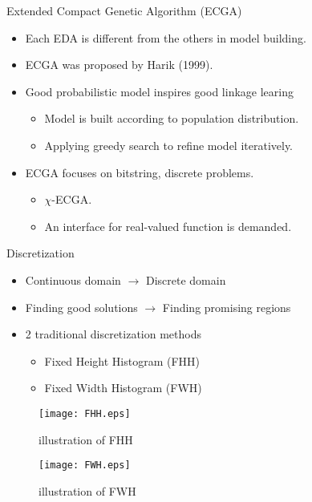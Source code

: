 \begin{frame}{Extended Compact Genetic Algorithm (ECGA)}
  \begin{itemize}
    \item Each EDA is different from the others in \alert{model
      building}.
      \vspace*{14pt}
    \item ECGA was proposed by Harik (1999).
      \vspace*{14pt}
    \item Good probabilistic model inspires good linkage learing
      \begin{itemize}
        \item Model is built according to population distribution.
        \item Applying greedy search to refine model iteratively.
      \end{itemize}
      \vspace*{14pt}
    \item ECGA focuses on bitstring, discrete problems.
      \begin{itemize}
        \item $\chi$-ECGA.
        \item An interface for real-valued function is demanded.
      \end{itemize}
  \end{itemize}
\end{frame}

\begin{frame}{Discretization} 
  \begin{itemize} 
    \item Continuous domain $\rightarrow$ Discrete domain 
    \item Finding good solutions $\rightarrow$ Finding promising
      regions
    \item 2 traditional discretization methods
      \begin{itemize}
        \item Fixed Height Histogram (FHH)
        \item Fixed Width Histogram (FWH)
      \end{itemize}
  \end{itemize}
  \begin{minipage}{.45\textwidth}
    \begin{figure}
      \centering
      \texttt{[image: FHH.eps]}
      \caption{illustration of FHH}
    \end{figure}
  \end{minipage}
  \begin{minipage}{.45\textwidth}
    \begin{figure}
      \centering
      \texttt{[image: FWH.eps]}
      \caption{illustration of FWH}
    \end{figure}
  \end{minipage}

\end{frame}

